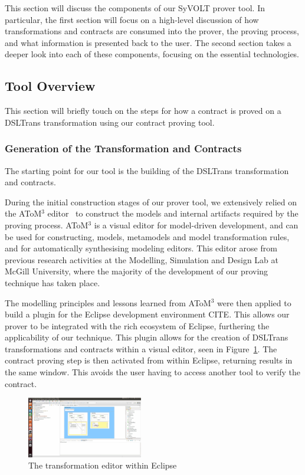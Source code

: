 This section will discuss the components of our SyVOLT prover tool. In particular, the first section will focus on a high-level discussion of how transformations and contracts are consumed into the prover, the proving process, and what information is presented back to the user. The second section takes a deeper look into each of these components, focusing on the essential technologies.

\subsection{Tool Overview}
This section will briefly touch on the steps for how a contract is proved on a DSLTrans transformation using our contract proving tool.


\subsubsection{Generation of the Transformation and Contracts}
The starting point for our tool is the building of the DSLTrans transformation and contracts.

During the initial construction stages of our prover tool, we extensively relied on the AToM$^3$ editor~\cite{atom3:2002} to construct the models and internal artifacts required by the proving process.  AToM$^3$ is a visual editor for model-driven development, and can be used for constructing,  models, metamodels and model transformation rules, and for automatically 
 synthesising modeling editors. This editor arose from previous research activities at the Modelling, Simulation and Design Lab at McGill University, where the majority of the development of our proving technique has taken place.

The modelling principles and lessons learned from AToM$^3$ were then applied to build a plugin for the Eclipse development environment CITE. This allows our prover to be integrated with the rich ecosystem of Eclipse, furthering the applicability of our technique. This plugin allows for the creation of DSLTrans transformations and contracts within a visual editor, seen in Figure~\ref{fig:eclipse_frontend}. The contract proving step is then activated from within Eclipse, returning results in the same window. This avoids the user having to access another tool to verify the contract.

\begin{figure}
\centering
\includegraphics[width=0.45\textwidth]{figures/syvolt_prover/eclipse_frontend}
\caption{The transformation editor within Eclipse}
\label{fig:eclipse_frontend}
\end{figure}

